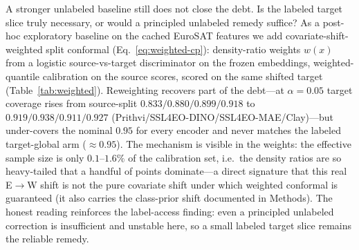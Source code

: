 \documentclass[preprint,11pt,authoryear]{elsarticle}
\begin{document}
A stronger unlabeled baseline still does not close the debt. Is the labeled target slice truly
necessary, or would a principled unlabeled remedy suffice? As a post-hoc exploratory baseline on the
cached EuroSAT features we add covariate-shift-weighted split conformal \citep{tibshirani2019covariate}
(Eq.~\eqref{eq:weighted-cp}):
density-ratio weights $w(x)$ from a logistic source-vs-target discriminator on the frozen embeddings,
weighted-quantile calibration on the source scores, scored on the same shifted target
(Table~\ref{tab:weighted}). Reweighting recovers part of the debt---at $\alpha=0.05$ target coverage
rises from source-split $0.833/0.880/0.899/0.918$ to $0.919/0.938/0.911/0.927$
(Prithvi/SSL4EO-DINO/SSL4EO-MAE/Clay)---but under-covers the nominal $0.95$ for every encoder and
never matches the labeled target-global arm (${\approx}0.95$). The mechanism is visible in the weights: the
effective sample size is only $0.1$--$1.6\%$ of the calibration set, i.e.\ the density ratios are so
heavy-tailed that a handful of points dominate---a direct signature that this real E$\to$W shift is
not the pure covariate shift under which weighted conformal is guaranteed (it also carries the
class-prior shift documented in Methods). The honest reading reinforces the label-access finding: even a
principled unlabeled correction is insufficient and unstable here, so a small labeled
target slice remains the reliable remedy.
\end{document}
